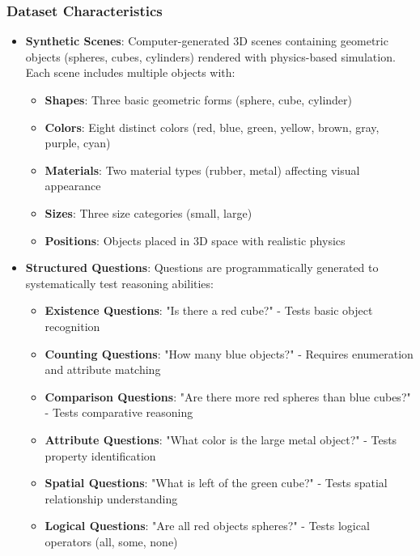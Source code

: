 \documentclass[conference]{IEEEtran}
\begin{document}
\subsubsection{Dataset Characteristics}

\begin{itemize}
    \item \textbf{Synthetic Scenes}: Computer-generated 3D scenes containing geometric objects (spheres, cubes, cylinders) rendered with physics-based simulation. Each scene includes multiple objects with:
    \begin{itemize}
        \item \textbf{Shapes}: Three basic geometric forms (sphere, cube, cylinder)
        \item \textbf{Colors}: Eight distinct colors (red, blue, green, yellow, brown, gray, purple, cyan)
        \item \textbf{Materials}: Two material types (rubber, metal) affecting visual appearance
        \item \textbf{Sizes}: Three size categories (small, large)
        \item \textbf{Positions}: Objects placed in 3D space with realistic physics
    \end{itemize}
    
    \item \textbf{Structured Questions}: Questions are programmatically generated to systematically test reasoning abilities:
    \begin{itemize}
        \item \textbf{Existence Questions}: "Is there a red cube?" - Tests basic object recognition
        \item \textbf{Counting Questions}: "How many blue objects?" - Requires enumeration and attribute matching
        \item \textbf{Comparison Questions}: "Are there more red spheres than blue cubes?" - Tests comparative reasoning
        \item \textbf{Attribute Questions}: "What color is the large metal object?" - Tests property identification
        \item \textbf{Spatial Questions}: "What is left of the green cube?" - Tests spatial relationship understanding
        \item \textbf{Logical Questions}: "Are all red objects spheres?" - Tests logical operators (all, some, none)
    \end{itemize}
    

\end{itemize}
\end{document}
